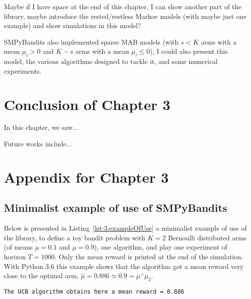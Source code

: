 
Maybe if I have space at the end of this chapter, I can show another part of the library, maybe introduce the rested/restless Markov models (with maybe just one example) and show simulations in this model?

SMPyBandits also implemented sparse MAB models (with $s<K$ arms with a mean $\mu_i>0$ and $K-s$ arms with a mean $\mu_i \leq 0$), I could also present this model, the various algorithms designed to tackle it, and some numerical experiments.


\section{Conclusion of Chapter 3}
\label{sec:3:conclusion}

In this chapter, we saw...

Future works include...




\section{Appendix for Chapter 3}
\label{sec:3:appendix}


\subsection{Minimalist example of use of SMPyBandits}

Below is presented in Listing~\ref{lst:3:exampleOfUse} a minimalist example of use of the library, to define a toy bandit problem with $K=2$ Bernoulli distributed arms (of means $\mu=0.1$ and $\mu=0.9$), one \UCB{} algorithm, and play one experiment of horizon $T=1000$.
Only the mean reward is printed at the end of the simulation.
%
With Python 3.6 this example shows that the algorithm got a mean reward very close to the optimal arm, $\hat{\mu} = 0.886 \simeq 0.9 = \mu^ = \mu_2$.
\begin{verbatim}
The UCB algorithm obtains here a mean reward = 0.886
\end{verbatim}

\begin{small}
    \inputminted[linenos=true,numbersep=5pt,frame=lines,framesep=2mm]{python3}{2-Chapters/3-Chapter/src/example_of_use_of_SMPyBandits.py}
\end{small}


